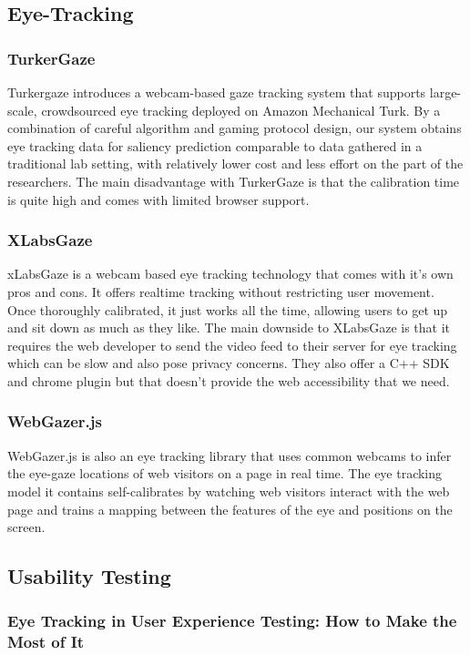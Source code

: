 \documentclass[a4paper,12pt,oneside]{article}
\begin{document}
\subsection{Eye-Tracking}
    
       \subsubsection{TurkerGaze}
       Turkergaze introduces a webcam-based gaze tracking system that supports large-scale, crowdsourced eye tracking deployed on Amazon Mechanical Turk. By a combination of careful algorithm and gaming protocol design, our system obtains eye tracking data for saliency prediction comparable to data gathered in a traditional lab setting, with relatively lower cost and less effort on the part of the researchers.
       The main disadvantage with TurkerGaze is that the calibration time is quite high and comes with limited browser support.
      

\subsubsection{XLabsGaze}
xLabsGaze is a webcam based eye tracking technology that comes with it's own pros and cons. It offers realtime tracking without restricting user movement. Once thoroughly calibrated, it just works all the time, allowing users to get up and sit down as much as they like. The main downside to XLabsGaze is that it requires the web developer to send the video feed to their server for eye tracking which can be slow and also pose privacy concerns. They also offer a C++ SDK and chrome plugin but that doesn't provide the web accessibility that we need.

\subsubsection{WebGazer.js}
     WebGazer.js is also an eye tracking library that uses common webcams to infer the eye-gaze locations of web visitors on a page in real time. The eye tracking model it contains self-calibrates by watching web visitors interact with the web page and trains a mapping between the features of the eye and positions on the screen.



\subsection{Usability Testing}
\subsubsection{Eye Tracking in User Experience Testing: How to Make the Most of It}
\end{document}
